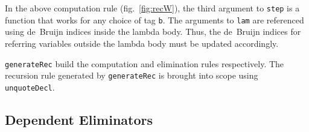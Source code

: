 \documentclass[runningheads]{llncs}
\begin{document}
In the above computation rule (fig.~\ref{fig:recW}), the third argument to {\tt step} is a function that works for any choice of tag \texttt{b}.
The arguments to {\tt lam} are referenced using de~Bruijn indices inside the lambda body.
Thus, the de~Bruijn indices for referring variables outside the lambda body must be updated accordingly.

{\tt generateRec} build the computation and elimination rules respectively. The recursion rule generated by {\tt generateRec} is brought into scope using {\tt unquoteDecl}.
%
%
%


\subsection{Dependent Eliminators}
\label{sec:sec3.2}
\end{document}

